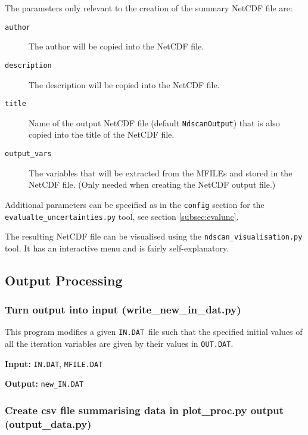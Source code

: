\documentclass[11pt,a4paper]{article}
\newcommand{\indat}{\mbox{\texttt{IN.DAT}}}
\newcommand{\mfile}{\mbox{\texttt{MFILE.DAT}}}
\newcommand{\outdat}{\mbox{\texttt{OUT.DAT}}}
\begin{document}
The parameters only relevant to the creation of the summary NetCDF file are:
\begin{description}
\item[\texttt{author}] The author will be copied into the NetCDF file.
\item[\texttt{description}] The description will be copied into the NetCDF file.
\item[\texttt{title}] Name of the output NetCDF file (default \texttt{NdscanOutput}) that is also copied into the title of the NetCDF file.
\item[\texttt{output\_vars}] The variables that will be extracted from the MFILEs and stored in the NetCDF file. (Only needed when creating the NetCDF output file.)
\end{description}
Additional parameters can be specified as in the \texttt{config} section for the \texttt{evalualte\_uncertainties.py} tool, see section \ref{subsec:evalunc}.

The resulting NetCDF file can be visualised using the \texttt{ndscan\_visualisation.py} tool. It has an interactive menu and is fairly self-explanatory.



\subsection{Output Processing}

\subsubsection{Turn output into input (write\_new\_in\_dat.py)}

This program modifies a given \indat\ file such that the specified initial values of all the iteration variables are given by their values in \outdat.

\begin{description}
\item{\textbf{Input:}}
\indat, \mfile\

\item{\textbf{Output:}}
\texttt{new\_IN.DAT}
\end{description}


\subsubsection{Create csv file summarising data in plot\_proc.py output (output\_data.py)}
\end{document}
